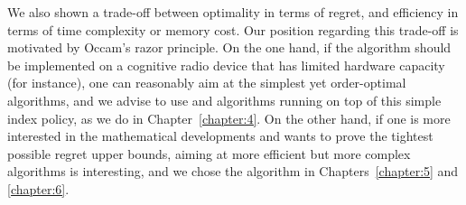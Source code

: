 We also shown a trade-off between optimality in terms of regret, and efficiency in terms of time complexity or memory cost.
Our position regarding this trade-off is motivated by Occam's razor principle.
On the one hand, if the algorithm should be implemented on a cognitive radio device that has limited hardware capacity (for instance),
one can reasonably aim at the simplest yet order-optimal algorithms, and we advise to use \UCB{} and algorithms running on top of this simple index policy, as we do in Chapter~\ref{chapter:4}.
On the other hand, if one is more interested in the mathematical developments and wants to prove the tightest possible regret upper bounds, aiming at more efficient but more complex algorithms is interesting, and we chose the \klUCB{} algorithm in Chapters~\ref{chapter:5} and \ref{chapter:6}.













